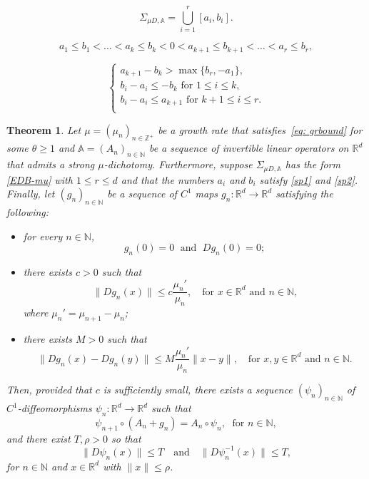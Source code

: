 \documentclass[10pt,a4paper]{amsart}
\newtheorem{theorem}{Theorem}
\def\N{\mathbb{N}}
\def\R{\mathbb{R}}
\def\Z{\mathbb{Z}}
\begin{document}
\begin{equation}\label{EDB-mu}
\Sigma_{\mu D, \mathbb A}=\bigcup_{i=1}^r [a_i, b_i].
\end{equation}

\begin{equation}\label{sp1}
a_1\le b_1 <\ldots <a_k\le b_k <0<a_{k+1}\le b_{k+1}<\ldots <a_r\le b_r,
\end{equation}

\begin{equation}\label{sp2}
\begin{cases}
a_{k+1}-b_k>\max \{b_r, -a_1\},\\
b_i-a_i\le -b_k \text{ for } 1\le i\le k,\\
b_i-a_i\le a_{k+1} \text{ for } k+1\le i \le r.\\
\end{cases}
\end{equation}

\begin{theorem}\label{theo: main linearization discrete}
Let $\mu=(\mu_n)_{n\in \Z^+}$ be a growth rate that satisfies~\eqref{eq: grbound} for some $\theta \ge 1$ and $\mathbb A=(A_n)_{n\in \mathbb N}$ be a sequence of invertible linear operators on $\mathbb R^d$ that admits a strong $\mu$-dichotomy. Furthermore, suppose $\Sigma_{\mu D, \mathbb A}$ has the form \eqref{EDB-mu}
with $1\le r\le d$ and that the numbers $a_i$ and $b_i$ satisfy \eqref{sp1} and \eqref{sp2}.
Finally, let $(g_n)_{n\in \N}$ be a sequence of $C^1$ maps $g_n\colon \R^d \to \R^d$ satisfying the following:
\begin{itemize}
\item for every $n\in \N$,
\begin{equation}\label{eq: gn 0 and Dgn 0}
g_n(0)=0 \;\text{ and } \; Dg_n(0)=0;
\end{equation}
\item there exists $c>0$ such that 
\begin{equation}\label{eq: bound deriv g}
\|Dg_n(x)\| \le c\frac{\mu_n'}{\mu_n}, \quad \text{for $x\in \R^d$ and $n\in \N$,}
\end{equation}
where $\mu_n'=\mu_{n+1}-\mu_n$;
\item there exists $M>0$ such that 
\begin{equation}\label{4-4-3}
\|Dg_n(x)-Dg_n(y)\| \le M\frac{\mu_n'}{\mu_n}\|x-y\|, \quad \text{for $x, y\in \R^d$ and $n\in \N$.}
\end{equation}
\end{itemize}
Then, provided that $c$ is sufficiently small, there exists a sequence $(\psi_n)_{n\in \N}$ of $C^1$-diffeomorphisms $\psi_n\colon \R^d \to \R^d$ such that
\begin{equation}\label{lincond}
\psi_{n+1}\circ (A_n+g_n)=A_n  \circ \psi_n, \; \text{ for } n\in \N,
\end{equation}
and there exist $T, \rho>0$ so that 
\begin{equation}\label{hn-1}
\|D\psi_n(x)\| \le T \quad \text{and} \quad \|D\psi_n^{-1}(x)\| \le T,
\end{equation}
for $n\in \N$ and $x\in \R^d$ with $\|x\|\le \rho$.
\end{theorem}
\end{document}
